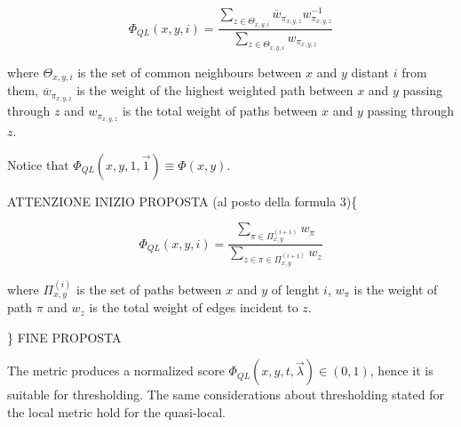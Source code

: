 \begin{equation}
\label{eqn:detection-quasi-local-2}
\Phi_{QL}(x,y,i)=
\frac{\sum\limits_{z\in\Theta_{x,y,i}}\overline{w}_{\pi_{x,y,z}}w_{\pi_{x,y,z}}^{-1}}
{\sum\limits_{z\in\Theta_{x,y,i}}w_{\pi_{x,y,z}}}
\end{equation}

where $\Theta_{x,y,i}$ is the set of common neighbours between $x$ and $y$ distant $i$ from them,
$\overline{w}_{\pi_{x,y,z}}$ is the weight of the highest weighted path between $x$ and $y$ passing through $z$ and
$w_{\pi_{x,y,z}}$ is the total weight of paths between $x$ and $y$ passing through $z$.

Notice that $\Phi_{QL}(x,y,1,\vec{1})\equiv\Phi(x,y)$.

ATTENZIONE INIZIO PROPOSTA (al posto della formula 3)\{

\begin{equation}
\label{eqn:detection-quasi-local-3}
\Phi_{QL}(x,y,i)=
\frac{\sum\limits_{\pi\in\Pi_{x,y}^{(i+1)}}w_{\pi}}
{\sum\limits_{z\in\pi\in\Pi_{x,y}^{(i+1)}}w_{z}}
\end{equation}

where $\Pi_{x,y}^{(i)}$ is the set of paths between $x$ and $y$ of lenght $i$,
$w_{\pi}$ is the weight of path $\pi$ and
$w_{z}$ is the total weight of edges incident to $z$.

\} FINE PROPOSTA

The metric produces a normalized score $\Phi_{QL}(x,y,t,\vec{\lambda})\in(0,1)$, hence it is suitable for thresholding. The same considerations about thresholding stated for the local metric hold for the quasi-local.


